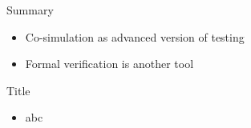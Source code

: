 \begin{frame}[fragile]{Summary}
\begin{itemize}
\item Co-simulation as advanced version of testing
\item Formal verification is another tool
\end{itemize}
\end{frame}




\begin{frame}[fragile]{Title}
\begin{itemize}
\item abc
\end{itemize}
\end{frame}

